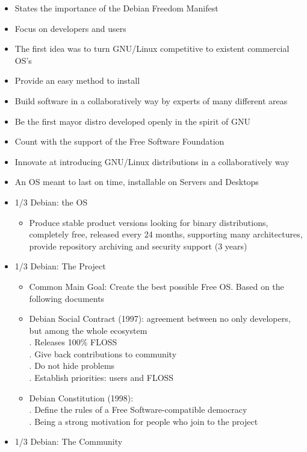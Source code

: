 \documentclass[11pt]{article} %
\begin{document}
  	\begin{itemize}
  	  \item States the importance of the Debian Freedom Manifest
  	  \item Focus on developers and users
  	  \item The first idea was to turn GNU/Linux competitive to existent commercial OS's
  	  \item Provide an easy method to install
  	  \item Build software in a collaboratively way by experts of many different areas
  	  \item Be the first mayor distro developed openly in the spirit of GNU
  	  \item Count with the support of the Free Software Foundation
  	  \item Innovate at introducing GNU/Linux distributions in a collaboratively way
  	  \item An OS meant to last on time, installable on Servers and Desktops
  	  \item 1/3 Debian: the OS
	  	\begin{itemize}
	  	  \item Produce stable product versions looking for binary distributions, completely free, released every 24 months, supporting many architectures, provide repository archiving and security support (3 years)
	  	\end{itemize}  	  
  	  \item 1/3 Debian: The Project
	  	\begin{itemize}
	  	  \item Common Main Goal: Create the best possible Free OS. Based on the following documents
	  	  \item Debian Social Contract (1997): agreement between no only developers, but among the whole ecosystem\\
	  	  		. Releases 100\% FLOSS\\
	  	  		. Give back contributions to community\\
	  	  		. Do not hide problems\\
	  	  		. Establish priorities: users and FLOSS
	  	  	\item Debian Constitution (1998):\\
	  	  		. Define the rules of a Free Software-compatible democracy\\
	  	  		. Being a strong motivation for people who join to the project
	  	\end{itemize} 
  	  \item 1/3 Debian: The Community

\end{itemize}
\end{document}
